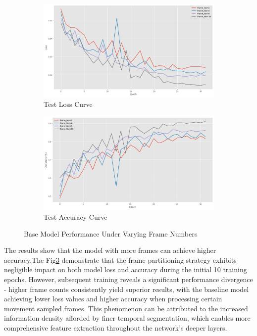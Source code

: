 \documentclass[conference]{IEEEtran}
\begin{document}
\begin{figure}[htbp]
    \begin{subfigure}[b]{0.24\textwidth}
        \centering
        \includegraphics[width=\textwidth]{figure/Test_loss.png}
        \caption{Test Loss Curve}
        \label{fig:sub3}
    \end{subfigure}
    \begin{subfigure}[b]{0.24\textwidth}
        \centering
        \includegraphics[width=\textwidth]{figure/Test_acc.png}
        \caption{Test Accuracy Curve}
        \label{fig:sub4}
    \end{subfigure}
    \caption{Base Model Performance Under Varying Frame Numbers}
    \label{fig:main_figure}
\end{figure}

The results show that the model with more frames can achieve higher accuracy.The Fig\ref{fig:main_figure} demonstrate that the frame partitioning strategy exhibits negligible impact on both model loss and accuracy during the initial 10 training epochs. However, subsequent training reveals a significant performance divergence - higher frame counts consistently yield superior results, with the baseline model achieving lower loss values and higher accuracy when processing certain movement sampled frames. This phenomenon can be attributed to the increased information density afforded by finer temporal segmentation, which enables more comprehensive feature extraction throughout the network's deeper layers.
\end{document}
